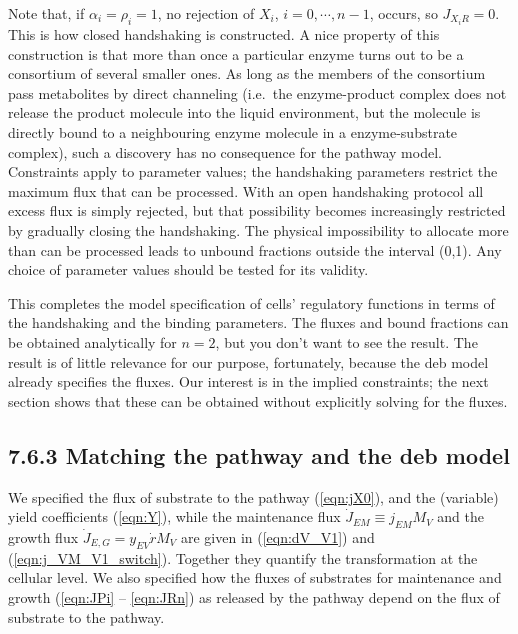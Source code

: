 Note that, if $\alpha_i = \rho_i = 1$, no rejection of $X_i$, $i = 0,\cdots,n-1$, occurs, so $J_{X_i R} = 0$. 
This is how closed handshaking is constructed. 
A nice property of this construction is that more than once a particular enzyme turns out to be a consortium of several smaller ones. 
As long as the members of the consortium pass metabolites by direct channeling (i.e.\ the enzyme-product complex does not release the product molecule into the liquid environment, but the molecule is directly bound to a neighbouring enzyme molecule in a enzyme-substrate complex), such a discovery has no consequence for the pathway model. 
Constraints apply to parameter values; the handshaking parameters restrict the maximum flux that can be processed. 
With an open handshaking protocol all excess flux is simply rejected, but that possibility becomes increasingly restricted by gradually closing the handshaking. 
The physical impossibility to allocate more than can be processed leads to unbound fractions outside the interval (0,1). Any choice of parameter values should be tested for its validity.

This completes the model specification of cells' regulatory functions in terms of the handshaking and the binding parameters. 
The fluxes and bound fractions can be obtained analytically for $n=2$, but you don't want to see the result. 
The result is of little relevance for our purpose, fortunately, because the {\sc deb} model already specifies the fluxes. 
Our interest is in the implied constraints; the next section shows that these can be obtained without explicitly solving for the fluxes.

\subsection*{7.6.3 Matching the pathway and the {\sc deb} model}
{}
\label{ssec_c:matching}

We specified the flux of substrate to the pathway (\ref{eqn:jX0}), and the (variable) yield coefficients (\ref{eqn:Y}), while the maintenance flux $\dot{J}_{EM} \equiv j_{EM} M_V$ and the growth flux $\dot{J}_{E,G} = y_{EV} \dot{r} M_V$ are given in (\ref{eqn:dV_V1}) and (\ref{eqn:j_VM_V1_switch}). 
Together they quantify the transformation at the cellular level. 
We also specified how the fluxes of substrates for maintenance and growth (\ref{eqn:JPi} -- \ref{eqn:JRn}) as released by the pathway depend on the flux of substrate to the pathway.

